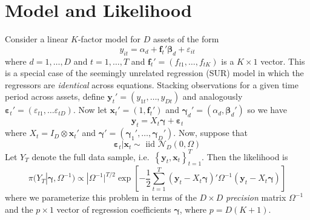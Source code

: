 \documentclass[12pt]{article}
\begin{document}
\section{Model and Likelihood}

Consider a linear $K$-factor model for $D$ assets of the form
\begin{equation*}
  y_{it}=\alpha _{d} + \mathbf{f}_{t}' \boldsymbol{\beta}_d + \varepsilon_{it}
\end{equation*}
where $d = 1, \hdots, D$ and $t = 1, \hdots, T$ and $\mathbf{f}_{t}'=\left(f_{t1}, \hdots,f_{tK}\right)$ is a $K\times1$ vector.
This is a special case of the seemingly unrelated regression (SUR) model in which the regressors are \emph{identical} across equations.
Stacking observations for a given time period across assets, define $\mathbf{y}_t' = (y_{1t}, \hdots, y_{Dt})$ and analogously $\boldsymbol{\varepsilon}_t' = \left( \varepsilon_{t1}, \hdots \varepsilon_{tD} \right)$.
Now let $\mathbf{x}_t' = (1, \mathbf{f}_t')$ and $\boldsymbol{\gamma}_d' = (\alpha_d, \boldsymbol{\beta}_d')$ so we have
\begin{equation*}
  \mathbf{y}_t = X_t \boldsymbol{\gamma} + \boldsymbol{\varepsilon}_t
\end{equation*}
where $X_t = I_D \otimes \mathbf{x}_t'$ and $\boldsymbol{\gamma}'= \left( \boldsymbol{\gamma}_1', \hdots, \boldsymbol{\gamma}_D' \right)$. 
Now, suppose that 
\begin{equation*}
  \boldsymbol{\varepsilon}_t|\mathbf{x}_t \sim \mbox{ iid } \mathcal{N}_D(0, \Omega)
\end{equation*}
Let $Y_T$ denote the full data sample, i.e.\ $\left\{ \mathbf{y}_t, \mathbf{x}_t \right\}_{t=1}^T$.
Then the likelihood is 
\begin{equation*}
  \pi(Y_T|\boldsymbol{\gamma},\Omega^{-1}) \propto |\Omega^{-1}|^{T/2} \exp\left[ -\frac{1}{2} \sum_{t=1}^T \left(\mathbf{y}_t - X_t \boldsymbol{\gamma} \right)' \Omega^{-1} \left(\mathbf{y}_t - X_t \boldsymbol{\gamma} \right)\right]
\end{equation*}
where we parameterize this problem in terms of the $D\times D$ \emph{precision} matrix $\Omega^{-1}$ and the $p\times1$ vector of regression coefficients $\boldsymbol{\gamma}$, where $p = D(K+1)$.
\end{document}
